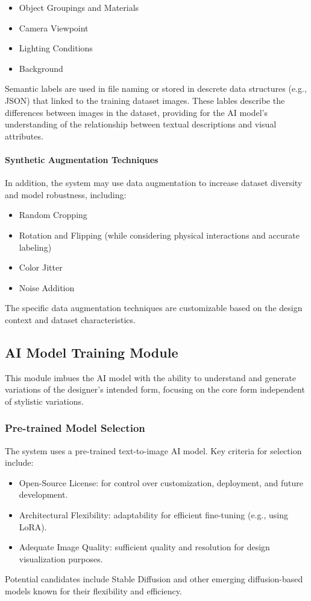 \documentclass[12pt]{article}
\begin{document}
\begin{itemize}
    \item Object Groupings and Materials
    \item Camera Viewpoint
    \item Lighting Conditions
    \item Background
\end{itemize}

Semantic labels are used in file naming or stored in descrete data structures (e.g., JSON) that linked to the training dataset images. These lables describe the differences between images in the dataset, providing for the AI model's understanding of the relationship between textual descriptions and visual attributes.

\paragraph{Synthetic Augmentation Techniques}

In addition, the system may use data augmentation to increase dataset diversity and model robustness, including:

\begin{itemize}
    \item Random Cropping
    \item Rotation and Flipping (while considering physical interactions and accurate labeling)
    \item Color Jitter
    \item Noise Addition 
\end{itemize}

The specific data augmentation techniques are customizable based on the design context and dataset characteristics.

\subsection{AI Model Training Module}
This module imbues the AI model with the ability to understand and generate variations of the designer's intended form, focusing on the core form independent of stylistic variations.

\subsubsection{Pre-trained Model Selection}
The system uses a pre-trained text-to-image AI model. Key criteria for selection include:
\begin{itemize}
    \item Open-Source License: for control over customization, deployment, and future development.
    \item Architectural Flexibility: adaptability for efficient fine-tuning (e.g., using LoRA).
    \item Adequate Image Quality: sufficient quality and resolution for design visualization purposes.
\end{itemize}
Potential candidates include Stable Diffusion and other emerging diffusion-based models known for their flexibility and efficiency.
\end{document}
